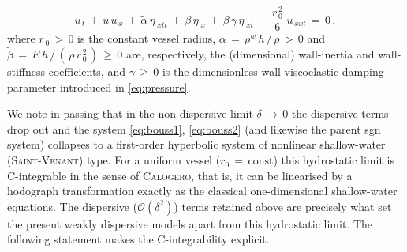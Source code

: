 \documentclass[alpha-refs, 12pt]{wiley-article}
\renewcommand{\O}{\mathcal{O}}
\renewcommand{\geq}{\geqslant}
\begin{document}
\begin{equation}\label{eq:bouss2}
  \bar{u}_{\,t}\, + \,\bar{u}\,\bar{u}_{\,x}\, + \,\tilde{\alpha}\,\eta_{\;xtt}\, + \,\tilde{\beta}\,\eta_{\;x}\, + \,\tilde{\beta}\,\gamma\,\eta_{\;xt}\, - \,\frac{r_{\,0}^{\,2}}{6}\;\bar{u}_{\,xxt}\, = \,0\,,
\end{equation}
where $r_{\,0}\,>\,0$ is the constant vessel radius, $\tilde{\alpha}\,=\,\rho^{w}\,h\,/\,\rho\,>\,0$ and $\tilde{\beta}\,=\,E\,h\,/\,(\,\rho\,r_{\,0}^{\,2}\,)\,\geq\,0$ are, respectively, the (dimensional) wall-inertia and wall-stiffness coefficients, and $\gamma\,\geq\,0$ is the dimensionless wall viscoelastic damping parameter introduced in \eqref{eq:pressure}.

We note in passing that in the non-dispersive limit $\delta\,\to\,0$ the dispersive terms drop out and the system \eqref{eq:bouss1}, \eqref{eq:bouss2} (and likewise the parent \acrshort{sgn} system) collapses to a first-order hyperbolic system of nonlinear shallow-water (\textsc{Saint}-\textsc{Venant}) type. For a uniform vessel ($r_{0}\,=\,\mathrm{const}$) this hydrostatic limit is C-integrable in the sense of \textsc{Calogero}, that is, it can be linearised by a hodograph transformation exactly as the classical one-dimensional shallow-water equations. The dispersive ($\O(\delta^{2})$) terms retained above are precisely what set the present weakly dispersive models apart from this hydrostatic limit. The following statement makes the C-integrability explicit.
\end{document}
